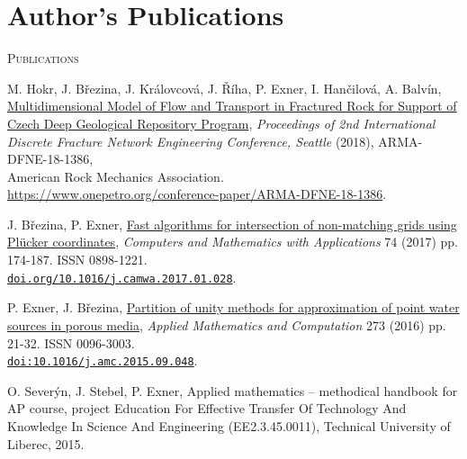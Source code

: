 \documentclass[bibliography=totocnumbered,dvipsnames,FM,Dis, EN]{tulthesis_autoreferat}
\begin{document}
% 
\newpage
\chapter{Author's Publications} \label{chap:publications}
% 
{\large\textsc{Publications}}
\begin{itemize}[label={}, leftmargin=*]

{\small
\item
M. Hokr, J. B{\v r}ezina, J. Kr{\' a}lovcov{\' a}, J. {\v R}{\' i}ha, P. Exner, I. Han{\v c}ilov{\' a}, A. Balv{\' i}n,
\href{https://www.onepetro.org/conference-paper/ARMA-DFNE-18-1386}
{Multidimensional Model of Flow and Transport in Fractured Rock for Support of Czech Deep Geological Repository Program},
\emph{Proceedings of 2nd International Discrete Fracture Network Engineering Conference, Seattle} (2018), ARMA-DFNE-18-1386, \\
American Rock Mechanics Association.\\
\url{https://www.onepetro.org/conference-paper/ARMA-DFNE-18-1386}.

\item
J. B{\v r}ezina, P. Exner, \href{http://www.sciencedirect.com/science/article/pii/S0898122117300792}{Fast algorithms for intersection of non-mat\-ching grids using Plücker coordinates},
\emph{Computers and Mathematics with Applications} 74 (2017) pp. 174-187. ISSN 0898-1221. \\
\href{https://doi.org/10.1016/j.camwa.2017.01.028}{\texttt{doi.org/10.1016/j.camwa.2017.01.028}}.

\item
P. Exner, J. B{\v r}ezina, \href{http://www.sciencedirect.com/science/article/pii/S0096300315012862}{Partition of unity methods for approximation of point water sources in porous media},
\emph{Applied Mathematics and Computation} 273 (2016) pp. 21-32. ISSN 0096-3003.\\
\href{http://dx.doi.org/10.1016/j.amc.2015.09.048}{\texttt{doi:10.1016/j.amc.2015.09.048}}.

\item
O. Sever{\' y}n, J. Stebel, P. Exner, Applied mathematics -- methodical handbook for AP course,
project Education For Effective Transfer Of Technology And Knowledge In Science And Engineering (EE2.3.45.0011),
Technical University of Liberec, 2015.

}
\end{itemize}
\end{document}
